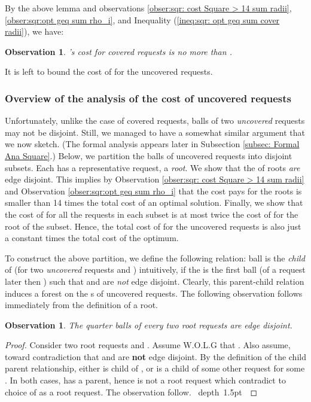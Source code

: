 \documentclass[11pt]{article}
\newtheorem{observation}[theorem]{Observation}
\def\blackslug{\hbox{\hskip 1pt \vrule width 4pt height 8pt
    depth 1.5pt \hskip 1pt}}
\def\QED{\quad\blackslug\lower 8.5pt\null\par}
\begin{document}
By the above lemma and observations \ref{obser:sqr: cost Square > 14 sum radii}, \ref{obser:sqr:opt geq sum rho_i},
and Inequality (\ref{ineq:sqr: opt geq sum cover radii}), we have:

\begin{observation}
\label{obs:covered}
's cost for covered requests is no more than .
\end{observation}
\vspace{0.3cm}
\noindent It is left to bound the cost of  for the uncovered requests.




\subsubsection{Overview of the analysis of the cost of uncovered requests}

Unfortunately, unlike the case of covered requests, balls of two {\em uncovered} requests may not be disjoint.
Still, we managed to have a somewhat similar argument that we now sketch.
(The formal analysis appears later in Subsection \ref{subsec: Formal Ana Square}.)
Below, we partition the balls of uncovered requests into disjoint subsets.
Each has a representative request, a {\em root}.
We show that the  of roots {\em are} edge disjoint.
This implies by Observation \ref{obser:sqr: cost Square > 14 sum radii} and Observation \ref{obser:sqr:opt geq sum rho_i}
that the cost  pays for the roots is smaller than 14 times the total cost of an optimal solution.
Finally, we show that the cost of  for all the requests in each subset is at most twice the cost of   for the root of the subset.
Hence, the total cost of  for the uncovered requests is also just a constant times the total cost of the optimum.


To construct the above partition, we define the following relation:
ball  is the {\em child} of  (for two {\em uncovered} requests  and ) intuitively,
if the  is the first ball (of a request later then ) such that  and  are {\em not} edge disjoint.
Clearly, this parent-child relation induces a forest on the s of uncovered requests.
The following observation follows immediately from the definition of a root.

\begin{observation}
\label{obs:roots-distjoint}
The quarter balls of every two root requests are edge disjoint.
\end{observation}
\begin{proof}
Consider two root requests  and . Assume W.O.L.G that .
Also assume, toward contradiction that  and  are {\bf not} edge disjoint.
By the definition of the child parent relationship, either  is child of , or  is a child of some other request  for some .
In both cases,  has a parent, hence  is not a root request which contradict to choice of  as a root request.
The observation follow.
\QED
\end{proof}
\end{document}
